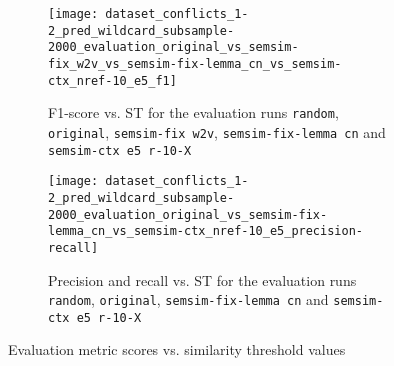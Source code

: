\documentclass[11pt]{scrreprt}
\begin{document}
 
 
 
\begin{figure}
 \centering
 \begin{subfigure}{\textwidth}
	\texttt{[image: dataset\_conflicts\_1-2\_pred\_wildcard\_subsample-2000\_evaluation\_original\_vs\_semsim-fix\_w2v\_vs\_semsim-fix-lemma\_cn\_vs\_semsim-ctx\_nref-10\_e5\_f1]}
	\caption{F1-score vs. ST for the evaluation runs \texttt{random}, \texttt{original}, \texttt{semsim-fix w2v}, \texttt{semsim-fix-lemma cn} and \texttt{semsim-ctx e5 r-10-X}}
	\label{fig:best-f1-per-pattern}
 \end{subfigure}
 \newline
 \newline
 \begin{subfigure}{\textwidth}
	\texttt{[image: dataset\_conflicts\_1-2\_pred\_wildcard\_subsample-2000\_evaluation\_original\_vs\_semsim-fix-lemma\_cn\_vs\_semsim-ctx\_nref-10\_e5\_precision-recall]}
	\caption{Precision and  recall vs. ST for the evaluation runs \texttt{random}, \texttt{original}, \texttt{semsim-fix-lemma cn} and \texttt{semsim-ctx e5 r-10-X}}
	\label{fig:prec-rec-best-semsim}
 \end{subfigure}
 \caption{Evaluation metric scores vs. similarity threshold values}
\end{figure}
 
%
\end{document}
